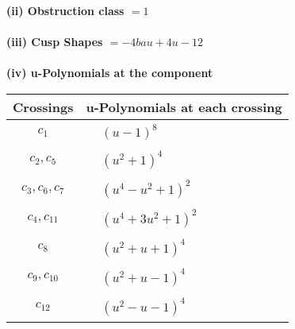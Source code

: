 \documentclass[1p]{elsarticle_modified}
\theoremstyle{definition}
\begin{document}
\flushleft \textbf{(ii) Obstruction class $= 1$}\\~\\
\flushleft \textbf{(iii) Cusp Shapes $= -4 b a u+4 u-12$}\\~\\
\newpage\renewcommand{\arraystretch}{1}
\flushleft \textbf{(iv) u-Polynomials at the component}\newline \\
\begin{tabular}{m{50pt}|m{274pt}}
Crossings & \hspace{64pt}u-Polynomials at each crossing \\
\hline $$\begin{aligned}c_{1}\end{aligned}$$&$\begin{aligned}
&(u-1)^8
\end{aligned}$\\
\hline $$\begin{aligned}c_{2},c_{5}\end{aligned}$$&$\begin{aligned}
&(u^2+1)^4
\end{aligned}$\\
\hline $$\begin{aligned}c_{3},c_{6},c_{7}\end{aligned}$$&$\begin{aligned}
&(u^4- u^2+1)^2
\end{aligned}$\\
\hline $$\begin{aligned}c_{4},c_{11}\end{aligned}$$&$\begin{aligned}
&(u^4+3 u^2+1)^2
\end{aligned}$\\
\hline $$\begin{aligned}c_{8}\end{aligned}$$&$\begin{aligned}
&(u^2+u+1)^4
\end{aligned}$\\
\hline $$\begin{aligned}c_{9},c_{10}\end{aligned}$$&$\begin{aligned}
&(u^2+u-1)^4
\end{aligned}$\\
\hline $$\begin{aligned}c_{12}\end{aligned}$$&$\begin{aligned}
&(u^2- u-1)^4
\end{aligned}$\\
\hline
\end{tabular}\\~\\
\end{document}
